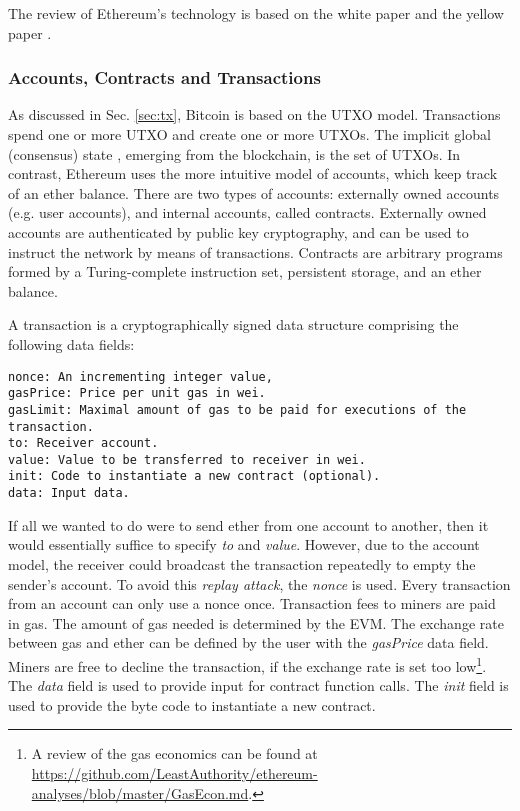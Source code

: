 The review of Ethereum's technology is based on the white paper \parencite{ethereumWhite} and the yellow paper \parencite{wood2014ethereum}. 

\subsubsection{Accounts, Contracts and Transactions}
\label{sec:ethereum:tech:tx}
As discussed in Sec. \ref{sec:tx}, Bitcoin is based on the \ac{UTXO} model. Transactions spend one or more \ac{UTXO} and create one or more \ac{UTXO}s. The implicit global (consensus) state , emerging from the blockchain, is the set of \ac{UTXO}s. In contrast, Ethereum uses the more intuitive model of accounts, which keep track of an ether balance. There are two types of accounts: externally owned accounts (e.g. user accounts), and internal accounts, called contracts. Externally owned accounts are authenticated by public key cryptography, and can be used to instruct the network by means of transactions. Contracts are arbitrary programs formed by a Turing-complete instruction set, persistent storage, and an ether balance. 

A transaction is a cryptographically signed data structure comprising the following data fields:
\begin{lstlisting}[breaklines]
nonce: An incrementing integer value,
gasPrice: Price per unit gas in wei.
gasLimit: Maximal amount of gas to be paid for executions of the transaction.
to: Receiver account.
value: Value to be transferred to receiver in wei.
init: Code to instantiate a new contract (optional).
data: Input data. 
\end{lstlisting}
If all we wanted to do were to send ether from one account to another, then it would essentially suffice to specify \emph{to} and \emph{value}. However, due to the account model, the receiver could broadcast the transaction repeatedly to empty the sender's account. To avoid this \emph{replay attack}, the \emph{nonce} is used. Every transaction from an account can only use a nonce once. Transaction fees to miners are paid in gas. The amount of gas needed is determined by the \ac{EVM}. The exchange rate between gas and ether can be defined by the user with the \emph{gasPrice} data field. Miners are free to decline the transaction, if the exchange rate is set too low\footnote{A review of the gas economics can be found at \url{https://github.com/LeastAuthority/ethereum-analyses/blob/master/GasEcon.md}.}. The \emph{data} field is used to provide input for contract function calls. The \emph{init} field is used to provide the byte code to instantiate a new contract.

